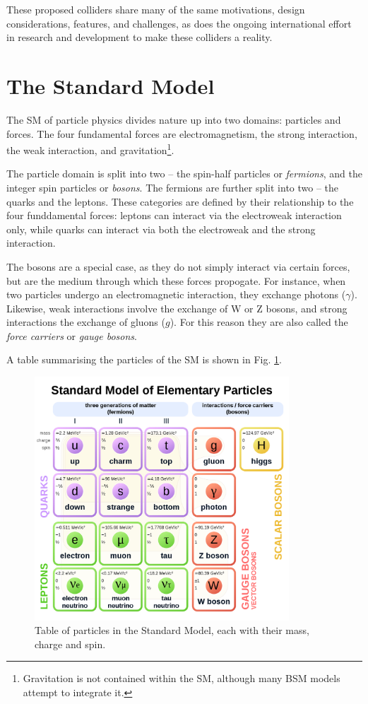 These proposed colliders share many of the same motivations, design considerations, features, and challenges, as does the ongoing international effort in research and development to make these colliders a reality.

\section{The Standard Model}
The \acrlong{SM} of particle physics divides nature up into two domains: particles and forces. The four fundamental forces are electromagnetism, the strong interaction, the weak interaction, and gravitation\footnote{Gravitation is not contained within the \acrshort{SM}, although many \acrshort{BSM} models attempt to integrate it.}.

The particle domain is split into two -- the spin-half particles or \textit{fermions}, and the integer spin particles or \textit{bosons}. The fermions are further split into two -- the quarks and the leptons. These categories are defined by their relationship to the four funddamental forces: leptons can interact via the electroweak interaction only, while quarks can interact via both the electroweak and the strong interaction.

The bosons are a special case, as they do not simply interact via certain forces, but are the medium through which these forces propogate. For instance, when two particles undergo an electromagnetic interaction, they exchange photons ($\gamma$). Likewise, weak interactions involve the exchange of W or Z bosons, and strong interactions the exchange of gluons ($g$). For this reason they are also called the \textit{force carriers} or \textit{gauge bosons}.

A table summarising the particles of the \acrlong{SM} is shown in Fig. \ref{figure:colliders/SM}.

\begin{figure}[h]
	\centering
	\includegraphics[width=0.85\textwidth]{../Pictures/StandardModel.png}
	\caption{Table of particles in the Standard Model, each with their mass, charge and spin.}
	\label{figure:colliders/SM}
\end{figure}


